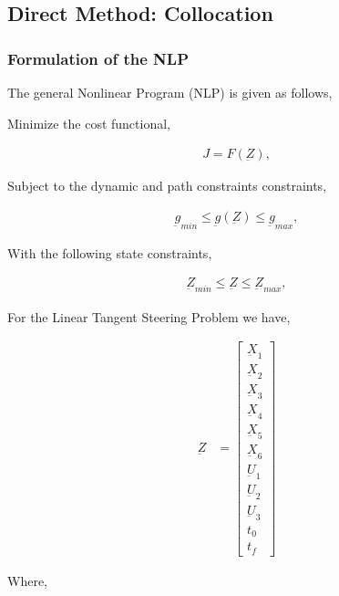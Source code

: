 \documentclass[11pt,usenames]{article}
\begin{document}
	
	\newpage
	
	
	\subsection{Direct Method: Collocation}
	
	\subsubsection{Formulation of the NLP}
	
	The general Nonlinear Program (NLP) is given as follows,
	
	Minimize the cost functional,
	
	\begin{align} 
	J = F(\underbar Z),
	\end{align}
	
	Subject to the dynamic and path constraints constraints,
	
	\begin{align}
	\underbar g_{min} \leq \underbar g(\underbar Z) \leq \underbar g_{max},
	\end{align}
	
	With the following state constraints,
	
	\begin{align}
	\underbar Z_{min} \leq \underbar  Z \leq \underbar Z_{max},
	\end{align}
	
	For the Linear Tangent Steering Problem we have,
	
	\begin{align}
	\underbar Z &= 
	\begin{bmatrix}
	\underbar X_{1} \\ \underbar X_{2} \\ \underbar X_{3} \\ \underbar X_{4} \\ \underbar X_{5} \\ \underbar X_{6} \\ \underbar U_{1} \\ \underbar U_{2} \\ \underbar U_{3} \\ t_{0} \\ t_{f}
	\end{bmatrix}
	\end{align}
	
	Where,
	
\end{document}
